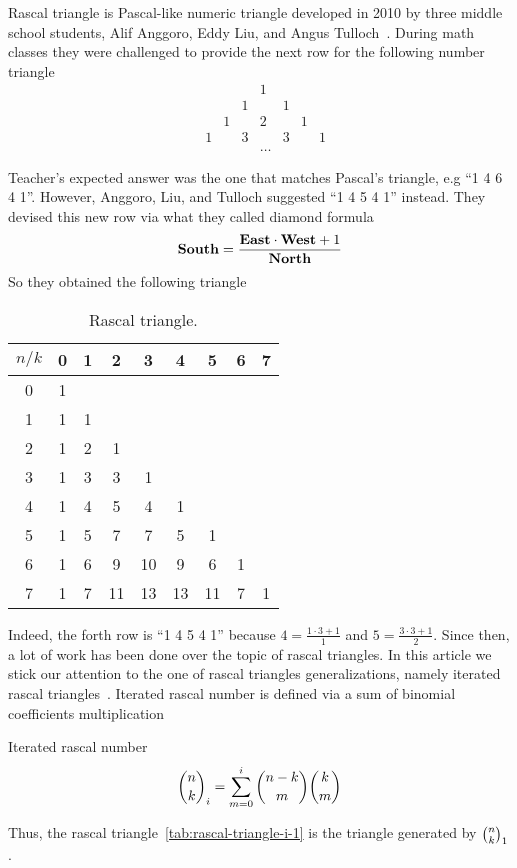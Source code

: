 Rascal triangle is Pascal-like numeric triangle developed in 2010 by three middle school students,
Alif Anggoro, Eddy Liu, and Angus Tulloch~\cite{anggoro2010rascal}.
During math classes they were challenged to provide the next row for the following number triangle
\[
    \begin{array}{cccccccc}
        &   &   &   & 1 &   &   &   \\
        &   &   & 1 &   & 1 &   &   \\
        &   & 1 &   & 2 &   & 1 &   \\
        & 1 &   & 3 &   & 3 &   & 1 \\
        & & & & \dots & &
    \end{array}
\]

Teacher's expected answer was the one that matches Pascal's triangle, e.g ``1 4 6 4 1''.
However, Anggoro, Liu, and Tulloch suggested ``1 4 5 4 1'' instead.
They devised this new row via what they called diamond formula
\begin{align*}
    \mathbf{South}  = \frac{\mathbf{East} \cdot \mathbf{West} + 1}{\mathbf{North}}
\end{align*}
So they obtained the following triangle
\begin{table}[H]
    \begin{center}
        \setlength\extrarowheight{-6pt}
        \begin{tabular}{c|cccccccc}
            $n/k$ & 0 & 1 & 2  & 3  & 4  & 5  & 6 & 7 \\
            \hline
            0     & 1 &   &    &    &    &    &   &   \\
            1     & 1 & 1 &    &    &    &    &   &   \\
            2     & 1 & 2 & 1  &    &    &    &   &   \\
            3     & 1 & 3 & 3  & 1  &    &    &   &   \\
            4     & 1 & 4 & 5  & 4  & 1  &    &   &   \\
            5     & 1 & 5 & 7  & 7  & 5  & 1  &   &   \\
            6     & 1 & 6 & 9  & 10 & 9  & 6  & 1 &   \\
            7     & 1 & 7 & 11 & 13 & 13 & 11 & 7 & 1
        \end{tabular}
    \end{center}
    \caption{Rascal triangle.}
    \label{tab:rascal-triangle-i-1}
\end{table}
Indeed, the forth row is ``1 4 5 4 1'' because $4= \frac{1 \cdot 3 + 1}{1}$ and $5 = \frac{3 \cdot 3 + 1}{2}$.
Since then, a lot of work has been done over the topic of rascal triangles.
In this article we stick our attention to the one of rascal triangles generalizations,
namely iterated rascal triangles~\cite{gregory2023iterated}.
Iterated rascal number is defined via a sum of binomial coefficients multiplication
\begin{definition}
    Iterated rascal number
    \begin{align}
        \binom{n}{k}_{i} = \sum_{m=0}^{i} \binom{n-k}{m} \binom{k}{m}
    \end{align}
\end{definition}
Thus, the rascal triangle~\eqref{tab:rascal-triangle-i-1} is the triangle generated by $\binom{n}{k}_{1}$.

